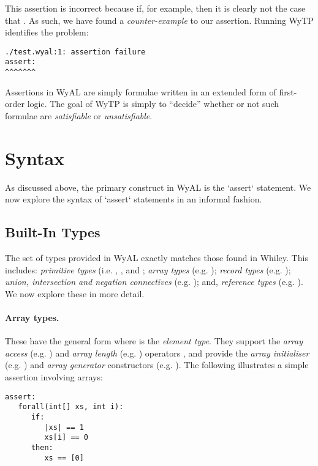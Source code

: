 This assertion is incorrect because if, for example,
 then it is clearly not the case that
.  As such, we have found a {\em counter-example}
to our assertion.  Running WyTP identifies the problem:
\begin{lstlisting}
./test.wyal:1: assertion failure
assert:
^^^^^^^
\end{lstlisting}

Assertions in WyAL are simply formulae written in an extended form of
first-order logic.  The goal of WyTP is simply to ``decide'' whether
or not such formulae are {\em satisfiable} or {\em unsatisfiable}.  


\section{Syntax}
As discussed above, the primary construct in WyAL is the `assert`
statement.  We now explore the syntax of `assert` statements in an
informal fashion.


\subsection{Built-In Types}

The set of types provided in WyAL exactly matches those found in
Whiley.  This includes: {\em primitive types} (i.e. ,
,  and ; {\em array
    types} (e.g. ); {\em record types}
  (e.g. ); {\em union, intersection and
    negation connectives} (e.g. ); and,
  {\em reference types} (e.g. ).  We now explore these
  in more detail.

  \paragraph{Array types.} These have the general form 
  where  is the {\em element type}.  They support the
  {\em array access} (e.g. ) and {\em array length}
  (e.g. ) operators , and provide the {\em array
    initialiser} (e.g. \clstinline{[1,2,3]}) and {\em array generator}
  constructors (e.g. \clstinline{[0;n]}).  The following illustrates a
  simple assertion involving arrays:

\begin{lstlisting}[language=WyAL]
assert:
   forall(int[] xs, int i):
      if:
         |xs| == 1
         xs[i] == 0
      then:
         xs == [0]
\end{lstlisting}

